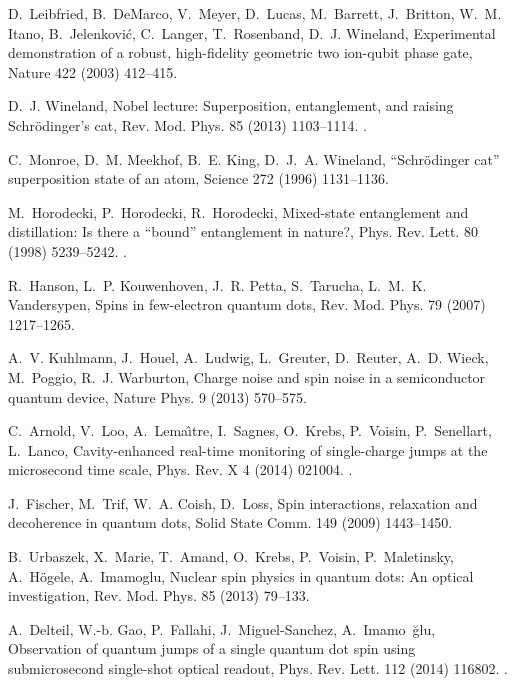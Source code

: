 \documentclass[3p,sort&compress,12pt]{elsarticle}
\begin{document}
\begin{thebibliography}{100}
D.~Leibfried, B.~DeMarco, V.~Meyer, D.~Lucas, M.~Barrett, J.~Britton, W.~M.
  Itano, B.~Jelenkovi{\'c}, C.~Langer, T.~Rosenband, D.~J. Wineland,
  Experimental demonstration of a robust, high-fidelity geometric two ion-qubit
  phase gate, Nature 422 (2003) 412--415.

D.~J. Wineland, Nobel lecture: Superposition, entanglement, and raising
  {S}chr{\"o}dinger's cat, Rev. Mod. Phys. 85 (2013) 1103--1114.
\newblock \href {http://dx.doi.org/10.1103/RevModPhys.85.1103}
  {}.

C.~Monroe, D.~M. Meekhof, B.~E. King, D.~J.~A. Wineland, {``}{S}chr{\"o}dinger
  cat{''} superposition state of an atom, Science 272 (1996) 1131--1136.

M.~Horodecki, P.~Horodecki, R.~Horodecki, Mixed-state entanglement and
  distillation: Is there a ``bound'' entanglement in nature?, Phys. Rev. Lett.
  80 (1998) 5239--5242.
\newblock \href {http://dx.doi.org/10.1103/PhysRevLett.80.5239}
  {}.

R.~Hanson, L.~P. Kouwenhoven, J.~R. Petta, S.~Tarucha, L.~M.~K. Vandersypen,
  Spins in few-electron quantum dots, Rev. Mod. Phys. 79 (2007) 1217--1265.

A.~V. Kuhlmann, J.~Houel, A.~Ludwig, L.~Greuter, D.~Reuter, A.~D. Wieck,
  M.~Poggio, R.~J. Warburton, Charge noise and spin noise in a semiconductor
  quantum device, Nature Phys. 9 (2013) 570--575.

C.~Arnold, V.~Loo, A.~Lema\^{\i}tre, I.~Sagnes, O.~Krebs, P.~Voisin,
  P.~Senellart, L.~Lanco, Cavity-enhanced real-time monitoring of single-charge
  jumps at the microsecond time scale, Phys. Rev. X 4 (2014) 021004.
\newblock \href {http://dx.doi.org/10.1103/PhysRevX.4.021004}
  {}.

J.~Fischer, M.~Trif, W.~A. Coish, D.~Loss, Spin interactions, relaxation and
  decoherence in quantum dots, Solid State Comm. 149 (2009) 1443--1450.

B.~Urbaszek, X.~Marie, T.~Amand, O.~Krebs, P.~Voisin, P.~Maletinsky,
  A.~H\"ogele, A.~Imamoglu, Nuclear spin physics in quantum dots: An optical
  investigation, Rev. Mod. Phys. 85 (2013) 79--133.

A.~Delteil, W.-b. Gao, P.~Fallahi, J.~Miguel-Sanchez,
  A.~Imamo\ifmmode~\else \u{g}\fi{}lu, Observation of quantum jumps of
  a single quantum dot spin using submicrosecond single-shot optical readout,
  Phys. Rev. Lett. 112 (2014) 116802.
\newblock \href {http://dx.doi.org/10.1103/PhysRevLett.112.116802}
  {}.


\end{thebibliography}
\end{document}
